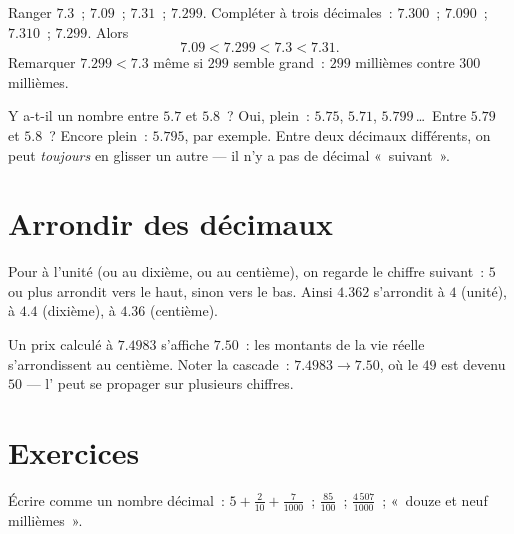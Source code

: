 \begin{example}\label{ex:g5:decimals:order}
Ranger $7.3$~; $7.09$~; $7.31$~; $7.299$. Compléter à trois
décimales~: $7.300$~; $7.090$~; $7.310$~; $7.299$. Alors
\[
7.09 < 7.299 < 7.3 < 7.31 .
\]
Remarquer $7.299 < 7.3$ même si $299$ semble grand~: $299$
millièmes contre $300$ millièmes.
\end{example}

\begin{example}\label{ex:g5:decimals:between}
Y a-t-il un nombre entre $5.7$ et $5.8$~? Oui, plein~: $5.75$,
$5.71$, $5.799$\,\dots\ Entre $5.79$ et $5.8$~? Encore plein~:
$5.795$, par exemple. Entre deux décimaux différents, on peut
\emph{toujours} en glisser un autre --- il n'y a pas de décimal
«~suivant~».
\end{example}

\section{Arrondir des décimaux}

\begin{definition}[Arrondi]\label{def:g5:decimals:round}
Pour  à l'unité (ou au dixième, ou au centième), on regarde
le chiffre suivant~: $5$ ou plus arrondit vers le haut, sinon vers
le bas. Ainsi $4.362$ s'arrondit à $4$ (unité), à $4.4$
(dixième), à $4.36$ (centième).
\end{definition}

\begin{example}\label{ex:g5:decimals:money}
Un prix calculé à $7.4983$ s'affiche $7.50$~: les montants de la
vie réelle s'arrondissent au centième. Noter la cascade~:
$7.4983 \to 7.50$, où le $49$ est devenu $50$ --- l' peut
se propager sur plusieurs chiffres.
\end{example}

\section{Exercices}

\begin{exercise}[$\star$]\label{exo:g5:decimals:1}
Écrire comme un nombre décimal~: $5 + \frac{2}{10} + \frac{7}{1000}$~;
\quad $\frac{85}{100}$~; \quad $\frac{4\,507}{1000}$~; \quad «~douze
et neuf millièmes~».
\end{exercise}

